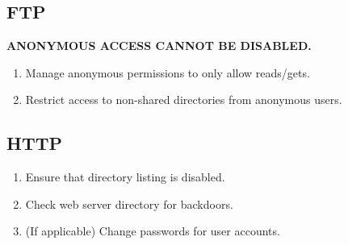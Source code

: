 \documentclass[12pt,letterpaper]{article}
\def\bf#1{\textbf{#1}}
\begin{document}
\subsection{FTP}

\bf{ANONYMOUS ACCESS CANNOT BE DISABLED.}

\begin{enumerate}
	\item Manage anonymous permissions to only allow reads/gets.
	\item Restrict access to non-shared directories from anonymous users.
\end{enumerate}

\subsection{HTTP}

\begin{enumerate}
	\item Ensure that directory listing is disabled.
	\item Check web server directory for backdoors.
	\item (If applicable) Change passwords for user accounts.
\end{enumerate}
\end{document}

